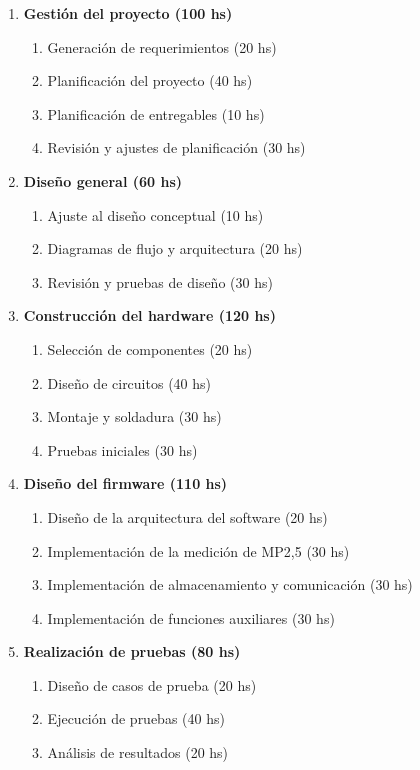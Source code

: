\begin{enumerate}
	\item\textbf{ Gestión del proyecto (100 hs)}
	\begin{enumerate}
		\item Generación de requerimientos (20 hs)
		\item Planificación del proyecto (40 hs)
		\item Planificación de entregables (10 hs)
		\item Revisión y ajustes de planificación (30 hs)
	\end{enumerate}
	
	\item\textbf{Diseño general (60 hs)}
	\begin{enumerate}
		\item Ajuste al diseño conceptual (10 hs)
		\item Diagramas de flujo y arquitectura (20 hs)
		\item Revisión y pruebas de diseño (30 hs)
	\end{enumerate}
	
	\item \textbf{Construcción del hardware (120 hs)}
	\begin{enumerate}
		\item Selección de componentes (20 hs)
		\item Diseño de circuitos (40 hs)
		\item Montaje y soldadura (30 hs)
		\item Pruebas iniciales (30 hs)
	\end{enumerate}
	
	\item \textbf{Diseño del firmware (110 hs)}
	\begin{enumerate}
		\item Diseño de la arquitectura del software (20 hs)
		\item Implementación de la medición de MP2,5 (30 hs)
		\item Implementación de almacenamiento y comunicación (30 hs)
		\item Implementación de funciones auxiliares (30 hs)
	\end{enumerate}
	
	\item \textbf{Realización de pruebas (80 hs)}
	\begin{enumerate}
		\item Diseño de casos de prueba (20 hs)
		\item Ejecución de pruebas (40 hs)
		\item Análisis de resultados (20 hs)
	\end{enumerate}
	

\end{enumerate}
